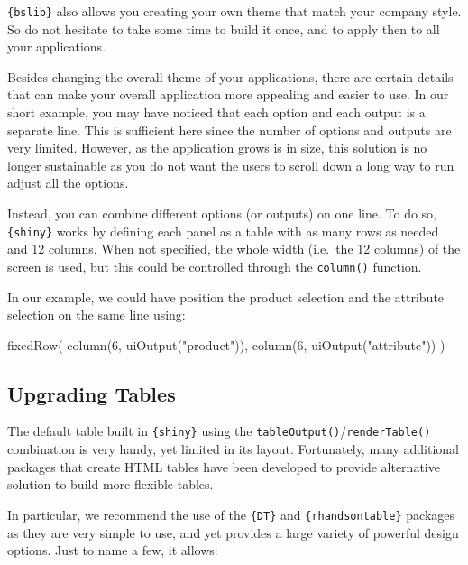 \documentclass[
]{book}
\newenvironment{Shaded}{\begin{snugshade}}{\end{snugshade}}
\newcommand{\DecValTok}[1]{\textcolor[rgb]{0.00,0.00,0.81}{#1}}
\newcommand{\FunctionTok}[1]{\textcolor[rgb]{0.00,0.00,0.00}{#1}}
\newcommand{\NormalTok}[1]{#1}
\newcommand{\StringTok}[1]{\textcolor[rgb]{0.31,0.60,0.02}{#1}}
\begin{document}
\texttt{\{bslib\}} also allows you creating your own theme that match your company style. So do not hesitate to take some time to build it once, and to apply then to all your applications.

Besides changing the overall theme of your applications, there are certain details that can make your overall application more appealing and easier to use. In our short example, you may have noticed that each option and each output is a separate line. This is sufficient here since the number of options and outputs are very limited. However, as the application grows is in size, this solution is no longer sustainable as you do not want the users to scroll down a long way to run adjust all the options.

Instead, you can combine different options (or outputs) on one line. To do so, \texttt{\{shiny\}} works by defining each panel as a table with as many rows as needed and 12 columns. When not specified, the whole width (i.e.~the 12 columns) of the screen is used, but this could be controlled through the \texttt{column()} function.

In our example, we could have position the product selection and the attribute selection on the same line using:

\begin{Shaded}
\begin{Highlighting}[]
\FunctionTok{fixedRow}\NormalTok{(}
  \FunctionTok{column}\NormalTok{(}\DecValTok{6}\NormalTok{, }\FunctionTok{uiOutput}\NormalTok{(}\StringTok{"product"}\NormalTok{)),}
  \FunctionTok{column}\NormalTok{(}\DecValTok{6}\NormalTok{, }\FunctionTok{uiOutput}\NormalTok{(}\StringTok{"attribute"}\NormalTok{))}
\NormalTok{)}
\end{Highlighting}
\end{Shaded}

\hypertarget{upgrading-tables}{%
\subsection{Upgrading Tables}\label{upgrading-tables}}

The default table built in \texttt{\{shiny\}} using the \texttt{tableOutput()}/\texttt{renderTable()} combination is very handy, yet limited in its layout. Fortunately, many additional packages that create HTML tables have been developed to provide alternative solution to build more flexible tables.

In particular, we recommend the use of the \texttt{\{DT\}} and \texttt{\{rhandsontable\}} packages as they are very simple to use, and yet provides a large variety of powerful design options. Just to name a few, it allows:
\end{document}
